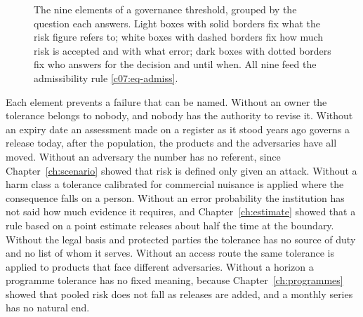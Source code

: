 \begin{figure}[ht]
\centering
{}
\caption{The nine elements of a governance threshold, grouped by the question each
answers. Light boxes with solid borders fix what the risk figure refers to; white
boxes with dashed borders fix how much risk is accepted and with what error; dark
boxes with dotted borders fix who answers for the decision and until when. All
nine feed the admissibility rule \eqref{c07:eq-admiss}.}
\label{c07:fig-elements}
\end{figure}

Each element prevents a failure that can be named. Without an owner the tolerance
belongs to nobody, and nobody has the authority to revise it. Without an expiry
date an assessment made on a register as it stood years ago governs a release
today, after the population, the products and the adversaries have all moved.
Without an adversary the number has no referent, since Chapter~\ref{ch:scenario}
showed that risk is defined only given an attack. Without a harm class a tolerance
calibrated for commercial nuisance is applied where the consequence falls on a
person. Without an error probability the institution has not said how much
evidence it requires, and Chapter~\ref{ch:estimate} showed that a rule based on a
point estimate releases about half the time at the boundary. Without the legal
basis and protected parties the tolerance has no source of duty and no list of whom
it serves. Without an access route the same tolerance is applied to products that
face different adversaries. Without a horizon a programme tolerance has no fixed
meaning, because Chapter~\ref{ch:programmes} showed that pooled risk does not fall
as releases are added, and a monthly series has no natural end.

